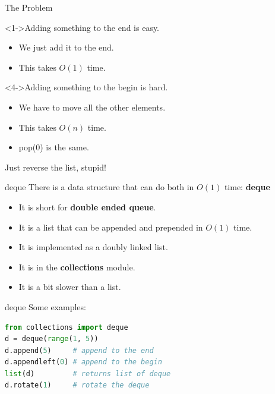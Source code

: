 \documentclass{beamer}
\begin{document}
\begin{frame}[fragile]{The Problem}
    \begin{alertblock}<1->{Adding something to the end is easy.}
        \begin{itemize}
            \item<2-> We just add it to the end.
            \item<3-> This takes $O(1)$ time.
        \end{itemize}
    \end{alertblock}
    \begin{alertblock}<4->{Adding something to the begin is hard.}
        \begin{itemize}
            \item<5-> We have to move all the other elements.
            \item<6-> This takes $O(n)$ time.
            \item<7-> pop(0) is the same.
        \end{itemize}
    \end{alertblock}
\end{frame}

\begin{frame}
    Just reverse the list, stupid!
\end{frame}

\begin{frame}{deque}
    There is a data structure that can do both in $O(1)$ time: \textbf{deque}\pause
    \begin{itemize}
        \item It is short for \textbf{double ended queue}.
        \item It is a list that can be appended and prepended in $O(1)$ time.
        \item It is implemented as a doubly linked list.
        \item It is in the \textbf{collections} module.
        \item It is a bit slower than a list.
    \end{itemize}
    
\end{frame}

\begin{frame}[fragile]{deque}
    Some examples:
    \begin{lstlisting}[language=Python, backgroundcolor = \color{lightgray}]
from collections import deque
d = deque(range(1, 5))
d.append(5)     # append to the end
d.appendleft(0) # append to the begin
list(d)         # returns list of deque
d.rotate(1)     # rotate the deque
    \end{lstlisting}
    \end{frame}
\end{document}
